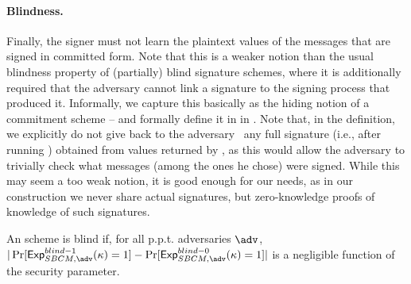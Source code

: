 \paragraph{Blindness.} %
Finally, the signer must not learn the plaintext values of the messages that are
signed in committed form. Note that this is a weaker notion than the usual
blindness property of (partially) blind signature schemes, where it is
additionally required that the adversary cannot link a signature to the signing
process that produced it. Informally, we capture this basically as the hiding
notion of a commitment scheme -- and formally define it in \ExpSBCMBlindb in
.
%
Note that, in the definition, we explicitly do not give back to the adversary
\adv~any full signature (i.e., after running \SBCMUnblind) obtained from values
returned by \adv, as this would allow the adversary to trivially check what
messages (among the ones he chose) were signed. While this may seem a too weak
notion, it is good enough for our needs, as in our \UAS construction we never
share actual signatures, but zero-knowledge proofs of knowledge of such
signatures.

An \SBCM scheme is blind if, for all p.p.t.
adversaries $\adv$, $|\Pr[\ExpSBCMBlindo(\secpar) = 1] -
\Pr[\ExpSBCMBlindz(\secpar) = 1]|$ is a negligible function of the security
parameter.

